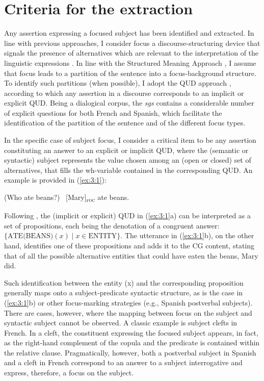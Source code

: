 \section {Criteria for the extraction} \label{sub:4.3}
\largerpage
Any assertion expressing a focused subject has been identified and extracted. In line with previous approaches, I consider focus a discourse-structuring device that signals the presence of alternatives which are relevant to the interpretation of the linguistic expressions \parencite{rooth1992theory, krifka2008basic}. In line with the Structured Meaning Approach \parencite{von1982structured, von1990current, jacobs2012fokus, krifka1991compositional, krifka2008basic}, I assume that focus leads to a partition of the sentence into a focus-background structure. To identify such partitions (when possible), I adopt the QUD approach \parencite{roberts1996information, velleman2016question, riester2018annotation}, according to which any assertion in a discourse corresponds to an implicit or explicit QUD. Being a dialogical corpus, the \textit{sgs} contains a considerable number of explicit questions for both French and Spanish, which facilitate the identification of the partition of the sentence and of the different focus types.

In the specific case of subject focus, I consider a critical item to be any assertion constituting an answer to an explicit or implicit QUD, where the (semantic or syntactic) subject represents the value chosen among an (open or closed) set of alternatives, that fills the wh-variable contained in the corresponding QUD. An example is provided in (\ref{ex:3:1}):


\ea \label{ex:3:1}
\ea (Who ate beans?)
\ex \ [Mary]\textsubscript{\textsc{foc}} \normalsize ate beans. \hfill \parencite[7]{velleman2016question}
\z \z


Following \textcite{hamblin1976questions}, the (implicit or explicit) QUD in (\ref{ex:3:1}a) can be interpreted as a set of propositions, each being the denotation of a congruent answer: \( \{ \text{ATE(BEANS)}(x) \mid x \in \text{ENTITY} \} \). The utterance in (\ref{ex:3:1}b), on the other hand,  identifies one of these propositions and adds it to the CG content, stating that of all the possible alternative entities that could have eaten the beans, Mary did.

Such identification between the entity (x) and the corresponding proposition generally maps onto a subject-predicate syntactic structure, as is the case in (\ref{ex:3:1}b) or other focus-marking strategies  (e.g., Spanish postverbal subjects). There are cases, however, where the mapping between focus on the subject and syntactic subject cannot be observed. A classic example is subject clefts in French. In a cleft, the constituent expressing the focused subject appears, in fact, as the right-hand complement of the copula and the predicate is contained within the relative clause. Pragmatically, however, both a postverbal subject in Spanish and a cleft in French correspond to an answer to a subject interrogative and express, therefore, a focus on the subject.


